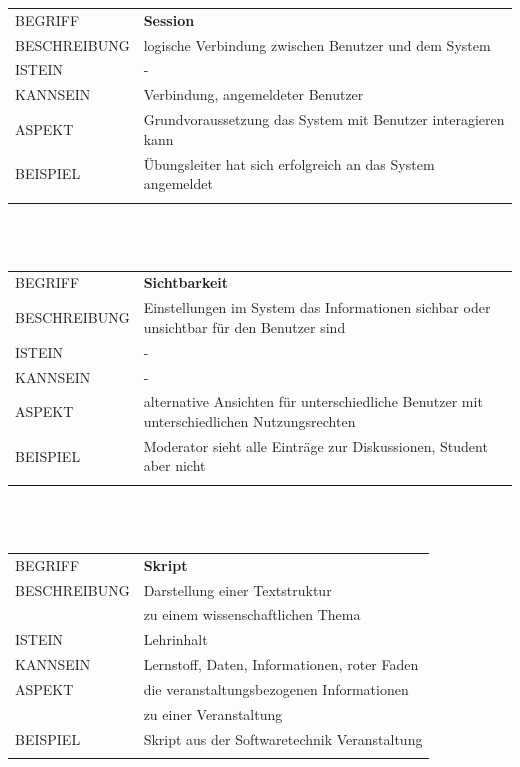 \documentclass[12pt,a4paper]{article}
\begin{document}
\begin{tabular}{l p{12cm}}
BEGRIFF 	 & \textbf{Session} \\ 
BESCHREIBUNG & logische Verbindung zwischen Benutzer und dem System\\ 
ISTEIN   	 & -\\
KANNSEIN 	 & Verbindung, angemeldeter Benutzer\\ 
ASPEKT   	 & Grundvoraussetzung das System mit Benutzer interagieren kann\\
BEISPIEL 	 & Übungsleiter hat sich erfolgreich an das System angemeldet\\\\
\hline
\end{tabular}\\\\  

\begin{tabular}{l p{12cm}}
BEGRIFF 	 & \textbf{Sichtbarkeit} \\ 
BESCHREIBUNG & Einstellungen im System das Informationen sichbar oder unsichtbar für den Benutzer sind\\ 
ISTEIN   	 & -\\
KANNSEIN 	 & -\\ 
ASPEKT   	 & alternative Ansichten für unterschiedliche Benutzer mit unterschiedlichen Nutzungsrechten \\
BEISPIEL 	 & Moderator sieht alle Einträge zur Diskussionen, Student aber nicht\\\\
\hline
\end{tabular}\\\\  


\begin{tabular}{l p{12cm}}
BEGRIFF 	 & \textbf{Skript} \\ 
BESCHREIBUNG & Darstellung einer Textstruktur\\
			 & zu einem wissenschaftlichen Thema\\ 
ISTEIN   	 & Lehrinhalt\\
KANNSEIN 	 & Lernstoff, Daten, Informationen, roter Faden\\ 
ASPEKT   	 & die veranstaltungsbezogenen Informationen\\
			 & zu einer Veranstaltung\\
BEISPIEL 	 & Skript aus der Softwaretechnik Veranstaltung\\\\
\hline
\end{tabular}\\\\  
\end{document}
